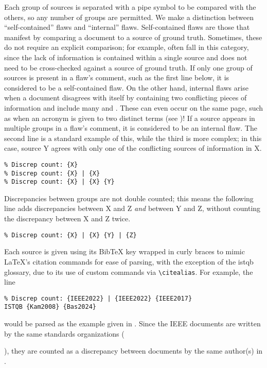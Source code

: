 Each group of
sources is separated with a pipe symbol to be compared with the others, so any
number of groups are permitted. We make a distinction between ``self-contained''
flaws and ``internal'' flaws. Self-contained flaws are those that manifest by
comparing a document to a source of ground truth. Sometimes, these do not
require an explicit comparison; for example,  often fall in this
category, since the lack of information is contained within a single source and
does not need to be cross-checked against a source of ground truth. If only one
group of sources is present in a flaw's comment, such as the first line
below, it is considered to be a self-contained flaw. On the other hand,
internal flaws arise when a document disagrees with itself by containing two
conflicting pieces of information and include many  and
. These can even occur on the same page, such as when an acronym
is given to two distinct terms (see )! If a
source appears in multiple groups in a flaw's comment, it is considered to
be an internal flaw. The second line is a standard example of this, while the
third is more complex; in this case, source Y agrees with only one of the
conflicting sources of information in X.
\begin{displayquote}
    \texttt{\% Discrep count: \{X\}\\\% Discrep count: \{X\} | \{X\}\\
        \% Discrep count: \{X\} | \{X\} \{Y\}}
\end{displayquote}
Discrepancies between groups are not double counted; this means the following
line adds discrepancies between X and Z \emph{and} between Y and Z, without
counting the discrepancy between X and Z twice.
\begin{displayquote}
    \texttt{\% Discrep count: \{X\} | \{X\} \{Y\} | \{Z\}}
\end{displayquote}

Each source is given using its BibTeX key wrapped in curly braces to mimic
\LaTeX{}'s citation commands for ease of parsing, with the exception of the
\acs{istqb} glossary, due to its use of custom commands via
\texttt{\textbackslash citealias}. For example, the line
\begin{displayquote}
    \texttt{\% Discrep count: \{IEEE2022\} | \{IEEE2022\} \{IEEE2017\}\\
        \displayNL ISTQB \{Kam2008\} \{Bas2024\}}
\end{displayquote}
would be parsed as the example given in . Since
the IEEE documents are written by the same standards organizations
(\begin{NoHyper}\citeauthor{IEEE2022}\end{NoHyper}), they are counted as a
discrepancy between documents by the same author(s) in .

